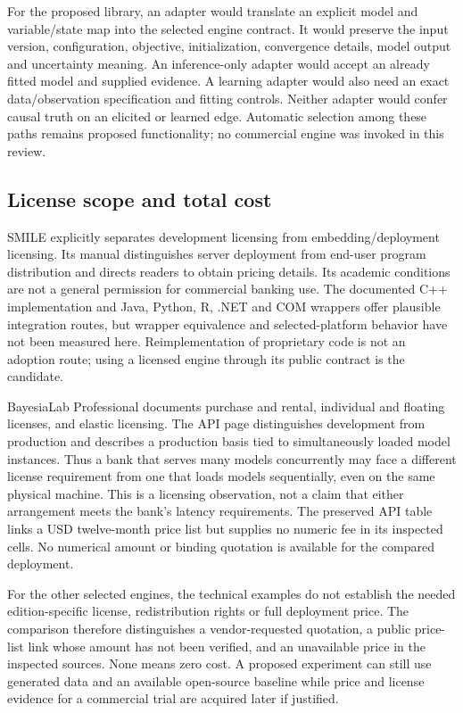 For the proposed library, an adapter would translate an explicit model
and variable/state map into the selected engine contract. It would
preserve the input version, configuration, objective, initialization,
convergence details, model output and uncertainty meaning. An
inference-only adapter would accept an already fitted model and supplied
evidence. A learning adapter would also need an exact data/observation
specification and fitting controls. Neither adapter would confer causal
truth on an elicited or learned edge. Automatic selection among these
paths remains proposed functionality; no commercial engine was invoked
in this review.

\hypertarget{license-scope-and-total-cost}{%
\subsection{License scope and total
cost}\label{license-scope-and-total-cost}}

SMILE explicitly separates development licensing from
embedding/deployment licensing. Its manual distinguishes server
deployment from end-user program distribution and directs readers to
obtain pricing details. Its academic conditions are not a general
permission for commercial banking use. The documented C++ implementation
and Java, Python, R, .NET and COM wrappers offer plausible integration
routes, but wrapper equivalence and selected-platform behavior have not
been measured here. Reimplementation of proprietary code is not an
adoption route; using a licensed engine through its public contract is
the candidate. \citep{exec13_smile_intro,exec13_smile_license}

BayesiaLab Professional documents purchase and rental, individual and
floating licenses, and elastic licensing. The API page distinguishes
development from production and describes a production basis tied to
simultaneously loaded model instances. Thus a bank that serves many
models concurrently may face a different license requirement from one
that loads models sequentially, even on the same physical machine. This
is a licensing observation, not a claim that either arrangement meets
the bank's latency requirements. The preserved API table links a USD
twelve-month price list but supplies no numeric fee in its inspected
cells. No numerical amount or binding quotation is available for the
compared deployment.
\citep{exec13_bayesia_api,exec13_bayesia_professional}

For the other selected engines, the technical examples do not establish
the needed edition-specific license, redistribution rights or full
deployment price. The comparison therefore distinguishes a
vendor-requested quotation, a public price-list link whose amount has
not been verified, and an unavailable price in the inspected sources.
None means zero cost. A proposed experiment can still use generated data
and an available open-source baseline while price and license evidence
for a commercial trial are acquired later if justified.


